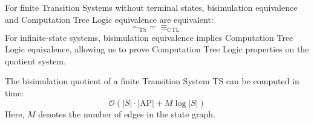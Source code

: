 \noindent For finite Transition Systems without terminal states, bisimulation equivalence and Computation Tree Logic equivalence are equivalent:
\[\sim_{\text{TS}}=\equiv_{\text{CTL}}\]
\noindent For infinite-state systems, bisimulation equivalence implies Computation Tree Logic equivalence, allowing us to prove Computation Tree Logic properties on the quotient system.
\begin{theorem}
    The bisimulation quotient of a finite Transition System $\text{TS}$ can be computed in time:
    \[\mathcal{O} \left(\left\lvert S\right\rvert \cdot \left\lvert \text{AP}\right\rvert  + M  \log \left\lvert S\right\rvert \right)\] 
    Here, $M$ denotes the number of edges in the state graph.
\end{theorem}